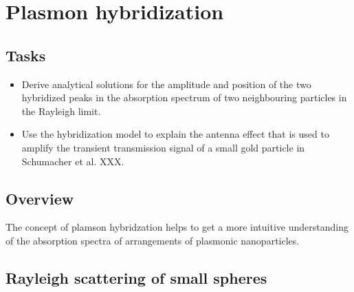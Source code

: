 


\chapter{Plasmon hybridization}

\section{Tasks}

\begin{itemize}
\item Derive analytical solutions for the  amplitude and position of the two hybridized peaks in the absorption spectrum of two neighbouring particles in the Rayleigh limit. 

\item Use the hybridization model to explain the antenna effect that is used to amplify the transient transmission signal of a small gold particle in Schumacher et al. XXX.

\end{itemize}



\section{Overview}


The concept of plamson hybridzation helps to get a more intuitive understanding of the absorption spectra of arrangements of plasmonic nanoparticles. 



\section{Rayleigh scattering of small spheres}


